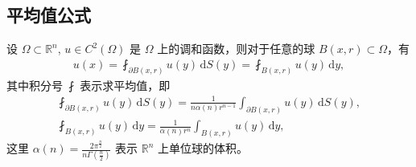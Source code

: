 \documentclass[../../main.tex]{subfiles}%
\begin{document}
\subsection{平均值公式}

\begin{theorem}[调和函数平均值公式]\label{theorem:调和函数平均值公式}
设 $\Omega\subset \mathbb{R}^n$, $u\in C^2(\Omega)$ 是 $\Omega$ 上的调和函数，则对于任意的球 $B(x,r)\subset\Omega$，有
\begin{align}
u(x) = \fint_{\partial B(x,r)} u(y)\,\mathrm{d}S(y) = \fint_{B(x,r)} u(y)\,\mathrm{d}y, \label{eq:mean-value}
\end{align}
其中积分号 $\fint$ 表示求平均值，即
\begin{gather*}
\fint_{\partial B(x,r)} u(y)\,\mathrm{d}S(y) = \frac{1}{n\alpha(n)r^{n-1}} \int_{\partial B(x,r)} u(y)\,\mathrm{d}S(y), \\
\fint_{B(x,r)} u(y)\,\mathrm{d}y = \frac{1}{\alpha(n)r^n} \int_{B(x,r)} u(y)\,\mathrm{d}y,
\end{gather*}
这里 $\alpha(n)=\frac{2\pi^{\frac{n}{2}}}{n\Gamma\left(\frac{n}{2}\right)}$ 表示 $\mathbb{R}^n$ 上单位球的体积。
\end{theorem}
\end{document}
